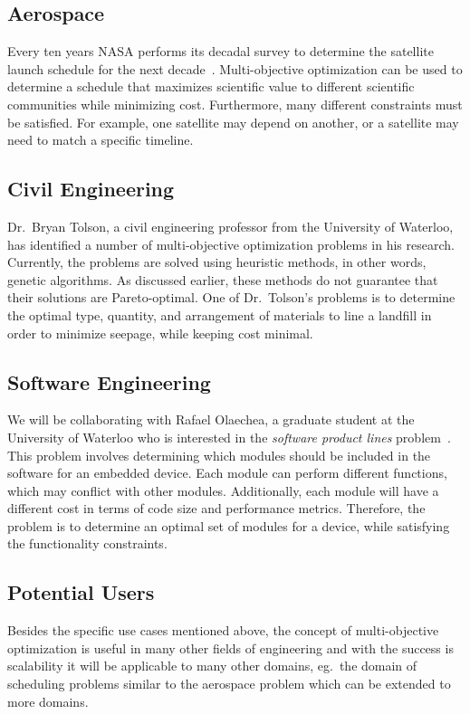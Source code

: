 \documentclass[11pt]{article}
\theoremstyle{definition}
\begin{document}
\subsection{Aerospace}\label{sec:aerospace}
Every ten years NASA performs its decadal survey to determine the
satellite launch schedule for the next decade~\cite{ref:nasa11}.
Multi-objective optimization can be used to determine a schedule that
maximizes scientific value to different scientific communities while
minimizing cost. Furthermore, many different constraints must be
satisfied. For example, one satellite may depend on another, or a
satellite may need to match a specific timeline.

\subsection{Civil Engineering}\label{sec:civil_eng}
Dr.\ Bryan Tolson, a civil engineering professor from the University of
Waterloo, has identified a number of multi-objective optimization
problems in his research. Currently, the problems are solved using
heuristic methods, in other words, genetic algorithms. As discussed
earlier, these methods do not guarantee that their solutions are
Pareto-optimal. One of Dr.\ Tolson's problems is to determine the
optimal type, quantity, and arrangement of materials to line a landfill
in order to minimize seepage, while keeping cost minimal.

\subsection{Software Engineering}\label{sec:soft_eng}
We will be collaborating with Rafael Olaechea, a graduate student at
the University of Waterloo who is interested in the \textit{software
product lines} problem~\cite{ref:Olaechea12}. This problem involves
determining which modules should be included in the software for an
embedded device. Each module can perform different functions, which may
conflict with other modules. Additionally, each module will have a
different cost in terms of code size and performance metrics.
Therefore, the problem is to determine an optimal set of modules for a
device, while satisfying the functionality constraints.

\subsection{Potential Users}\label{sec:potential_users}
Besides the specific use cases mentioned above, the concept of multi-objective optimization is useful in many other fields of engineering and with the success is scalability it will be applicable to many other domains, eg.\ the domain of scheduling problems similar to the aerospace problem which can be extended to more domains.
\end{document}
